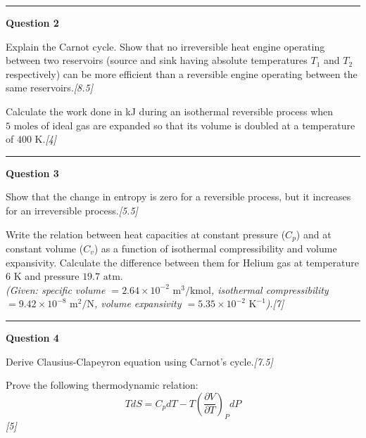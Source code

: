 \documentclass[11pt,a4paper]{article}
\newcommand{\pts}[1]{\hfill   \textit{[#1]}}
\begin{document}
\medskip\rule{\linewidth}{0.2pt}\medskip




\noindent   \textbf{Question 2}

\begin{parts}
  \item Explain the Carnot cycle. Show that no irreversible heat engine operating between two reservoirs (source and sink having absolute temperatures $T_1$ and $T_2$ respectively) can be more efficient than a reversible engine operating between the same reservoirs.\pts{8.5}
  \item Calculate the work done in kJ during an isothermal reversible process when $5 \text{ moles}$ of ideal gas are expanded so that its volume is doubled at a temperature of $400 \text{ K}$.\pts{4}
\end{parts}

\medskip\rule{\linewidth}{0.2pt}\medskip




\noindent   \textbf{Question 3}

\begin{parts}
  \item Show that the change in entropy is zero for a reversible process, but it increases for an irreversible process.\pts{5.5}
  \item Write the relation between heat capacities at constant pressure ($C_p$) and at constant volume ($C_v$) as a function of isothermal compressibility and volume expansivity. Calculate the difference between them for Helium gas at temperature $6 \text{ K}$ and pressure $19.7 \text{ atm}$.\\
   \textit{(Given: specific volume $= 2.64  \times 10^{-2} \text{ m}^3/ \text{kmol}$, isothermal compressibility $= 9.42  \times 10^{-8} \text{ m}^2/ \text{N}$, volume expansivity $= 5.35  \times 10^{-2} \text{ K}^{-1}$)}.\pts{7}
\end{parts}

\medskip\rule{\linewidth}{0.2pt}\medskip




\noindent   \textbf{Question 4}

\begin{parts}
  \item Derive Clausius-Clapeyron equation using Carnot's cycle.\pts{7.5}
  \item Prove the following thermodynamic relation:
  \[
  T dS = C_p dT - T \left(\frac{\partial V}{\partial T}\right)_P dP
  \]\pts{5}
\end{parts}
\end{document}
